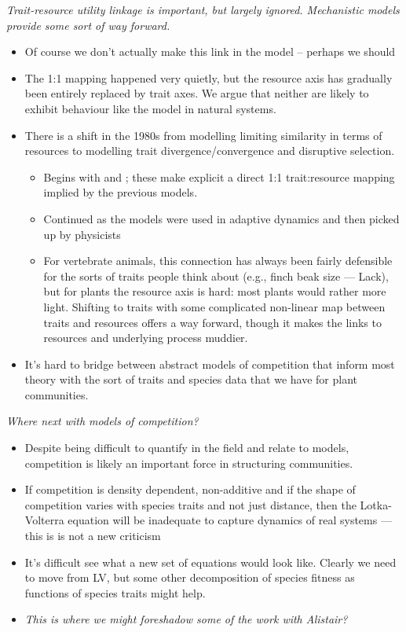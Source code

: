 \documentclass[a4paper,11pt]{article}
\begin{document}
\textit{Trait-resource utility linkage is important, but largely
  ignored.  Mechanistic models provide some sort of way forward.}
\begin{itemize}
\item Of course we don't actually make this link in the model --
  perhaps we should
\item The 1:1 mapping happened very quietly, but the resource axis has
  gradually been entirely replaced by trait axes.  We argue that
  neither are likely to exhibit behaviour like the
  \citet{MacArthur-1967} model in natural systems.
\item There is a shift in the 1980s from modelling limiting
  similarity in terms of resources to modelling trait
  divergence/convergence and disruptive selection.
  \begin{itemize}
  \item Begins with \citet{Taper-1985} and \citet{Brown-1987-140}; these
    make explicit a direct 1:1 trait:resource mapping implied by the
    previous models.
  \item Continued as the models were used in adaptive dynamics
    \citep[e.g.,][]{Dieckmann-1999} and then picked up by physicists
    \citep[e.g.,][]{Leimar-2013}
  \item For vertebrate animals, this connection has always been fairly
    defensible for the sorts of traits people think about (e.g., finch
    beak size --- Lack), but for plants the resource axis is hard: most
    plants would rather more light.  Shifting to traits with some
    complicated non-linear map between traits and resources offers a way
    forward, though it makes the links to resources and underlying
    process muddier.
  \end{itemize}
\item It's hard to bridge between abstract models of competition that
  inform most theory with the sort of traits and species data that we
  have for plant communities.
\end{itemize}

\textit{Where next with models of competition?}
\begin{itemize}
\item Despite being difficult to quantify in the field and relate to
  models, competition is likely an important force in structuring
  communities.
\item If competition is density dependent, non-additive and if the
  shape of competition varies with species traits and not just
  distance, then the Lotka-Volterra equation will be inadequate to
  capture dynamics of real systems --- this is is not a new criticism
  \citep[e.g., see][: ``The nearly complete dependence of theoretical
  community ecology on a limited number of simple
  models'']{Neill-1974}
\item It's difficult see what a new set of equations would look like.
  Clearly we need to move from LV, but some other decomposition of
  species fitness as functions of species traits might help.
\item \textit{This is where we might foreshadow some of the work with
    Alistair?}
\end{itemize}
\end{document}
